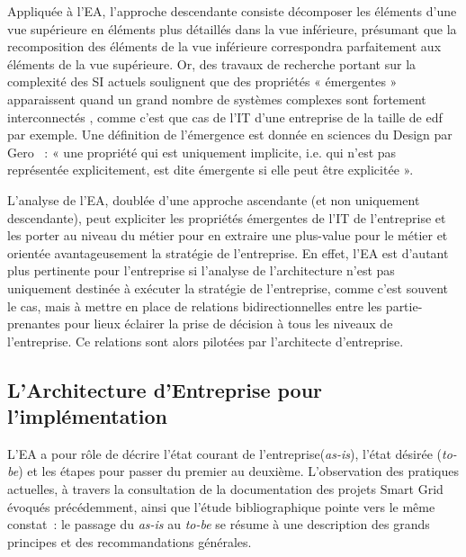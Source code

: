 	Appliquée à l'EA, l'approche descendante consiste décomposer les éléments d'une 
vue supérieure en éléments plus détaillés dans la vue inférieure, présumant que 
la recomposition des éléments de la vue inférieure correspondra parfaitement aux 
éléments de la vue supérieure. Or, des travaux de recherche portant sur la 
complexité des SI actuels soulignent que des propriétés « émergentes » 
apparaissent quand un grand nombre de systèmes complexes sont fortement 
interconnectés \cite{bullock2004complexity}, comme c'est que cas de l'IT d'une 
entreprise de la taille de \gls{edf} par exemple. Une définition de l'émergence 
est donnée en sciences du Design par Gero \cite{gero1992creativity}~: « une 
propriété qui est uniquement implicite, i.e. qui n'est pas représentée 
explicitement, est dite émergente si elle peut être explicitée ». 
	
	L'analyse de l'EA, doublée d'une approche ascendante (et non uniquement 
descendante), peut expliciter les propriétés émergentes de l'IT de l'entreprise 
et les porter au niveau du métier pour en extraire une plus-value pour le métier 
et orientée avantageusement la stratégie de l'entreprise. En effet, l'EA est 
d'autant plus pertinente pour l'entreprise si l'analyse de l'architecture n'est 
pas uniquement destinée à exécuter la stratégie de l'entreprise, comme c'est 
souvent le cas, mais à mettre en place de relations bidirectionnelles entre les 
partie-prenantes pour lieux éclairer la prise de décision à tous les niveaux de 
l'entreprise. Ce relations sont alors pilotées par l'architecte d'entreprise. 
	
	
	\subsection{L'Architecture d'Entreprise pour l'implémentation}
	
	L'EA a pour rôle de décrire l'état courant de l'entreprise(\textit{as-is}), 
l'état désirée (\textit{to-be}) et les étapes pour passer du premier au 
deuxième. L'observation des pratiques actuelles, à travers la consultation de la 
documentation des projets Smart Grid évoqués précédemment, ainsi que l'étude 
bibliographique pointe vers le même constat~: le passage du \textit{as-is} au 
\textit{to-be} se résume à une description des grands principes et des 
recommandations générales. 
	
